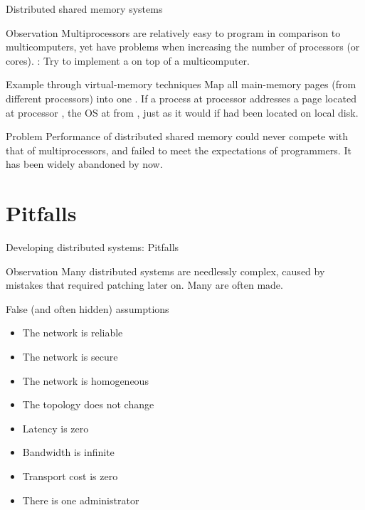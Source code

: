 \begin{frame}{Distributed shared memory systems}
  \begin{block}{Observation}
    Multiprocessors are relatively easy to program in comparison to multicomputers, yet have problems when
    increasing the number of processors (or cores). : Try to implement a  on top of a multicomputer.
  \end{block}
  \begin{exampleblock}{Example through virtual-memory techniques}
    Map all main-memory pages (from different processors) into one . If
    a process at processor  addresses a page  located at processor , the OS at 
     from , just as it would if  had been located on local disk.
  \end{exampleblock}
  \begin{block}{Problem}
    Performance of distributed shared memory could never compete with that of multiprocessors, and failed to
    meet the expectations of programmers. It has been widely abandoned by now.
  \end{block}
\end{frame}

\section{Pitfalls}
\begin{frame}{Developing distributed systems: Pitfalls}
  \begin{block}{Observation}
    Many distributed systems are needlessly complex, caused by mistakes that required patching later on.
    Many  are often made.
  \end{block}
  \onslide
  \begin{block}{False (and often hidden) assumptions}
    \begin{itemize}
      \item The network is reliable
      \item The network is secure
      \item The network is homogeneous
      \item The topology does not change
      \item Latency is zero
      \item Bandwidth is infinite
      \item Transport cost is zero
      \item There is one administrator
    \end{itemize}
  \end{block}
\end{frame}

